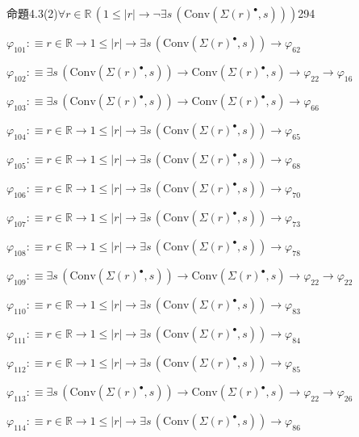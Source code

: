 \begin{fullproof}{命題4.3(2)}{$\forall r \in \mathbb{R}\,(1 \leq \lvert r \rvert \to \neg \exists s\,(\mathrm{Conv}(\Sigma {(r)^{\bullet}},s)))$}{294}
\begin{abbrevlist}
\item $\varphi_{101} :\equiv r \in \mathbb{R} \to 1 \leq \lvert r \rvert \to \exists s\,(\mathrm{Conv}(\Sigma {(r)^{\bullet}},s)) \to \varphi_{62}$
\item $\varphi_{102} :\equiv \exists s\,(\mathrm{Conv}(\Sigma {(r)^{\bullet}},s)) \to \mathrm{Conv}(\Sigma {(r)^{\bullet}},s) \to \varphi_{22} \to \varphi_{16}$
\item $\varphi_{103} :\equiv \exists s\,(\mathrm{Conv}(\Sigma {(r)^{\bullet}},s)) \to \mathrm{Conv}(\Sigma {(r)^{\bullet}},s) \to \varphi_{66}$
\item $\varphi_{104} :\equiv r \in \mathbb{R} \to 1 \leq \lvert r \rvert \to \exists s\,(\mathrm{Conv}(\Sigma {(r)^{\bullet}},s)) \to \varphi_{65}$
\item $\varphi_{105} :\equiv r \in \mathbb{R} \to 1 \leq \lvert r \rvert \to \exists s\,(\mathrm{Conv}(\Sigma {(r)^{\bullet}},s)) \to \varphi_{68}$
\item $\varphi_{106} :\equiv r \in \mathbb{R} \to 1 \leq \lvert r \rvert \to \exists s\,(\mathrm{Conv}(\Sigma {(r)^{\bullet}},s)) \to \varphi_{70}$
\item $\varphi_{107} :\equiv r \in \mathbb{R} \to 1 \leq \lvert r \rvert \to \exists s\,(\mathrm{Conv}(\Sigma {(r)^{\bullet}},s)) \to \varphi_{73}$
\item $\varphi_{108} :\equiv r \in \mathbb{R} \to 1 \leq \lvert r \rvert \to \exists s\,(\mathrm{Conv}(\Sigma {(r)^{\bullet}},s)) \to \varphi_{78}$
\item $\varphi_{109} :\equiv \exists s\,(\mathrm{Conv}(\Sigma {(r)^{\bullet}},s)) \to \mathrm{Conv}(\Sigma {(r)^{\bullet}},s) \to \varphi_{22} \to \varphi_{22}$
\item $\varphi_{110} :\equiv r \in \mathbb{R} \to 1 \leq \lvert r \rvert \to \exists s\,(\mathrm{Conv}(\Sigma {(r)^{\bullet}},s)) \to \varphi_{83}$
\item $\varphi_{111} :\equiv r \in \mathbb{R} \to 1 \leq \lvert r \rvert \to \exists s\,(\mathrm{Conv}(\Sigma {(r)^{\bullet}},s)) \to \varphi_{84}$
\item $\varphi_{112} :\equiv r \in \mathbb{R} \to 1 \leq \lvert r \rvert \to \exists s\,(\mathrm{Conv}(\Sigma {(r)^{\bullet}},s)) \to \varphi_{85}$
\item $\varphi_{113} :\equiv \exists s\,(\mathrm{Conv}(\Sigma {(r)^{\bullet}},s)) \to \mathrm{Conv}(\Sigma {(r)^{\bullet}},s) \to \varphi_{22} \to \varphi_{26}$
\item $\varphi_{114} :\equiv r \in \mathbb{R} \to 1 \leq \lvert r \rvert \to \exists s\,(\mathrm{Conv}(\Sigma {(r)^{\bullet}},s)) \to \varphi_{86}$

\end{abbrevlist}
\end{fullproof}
